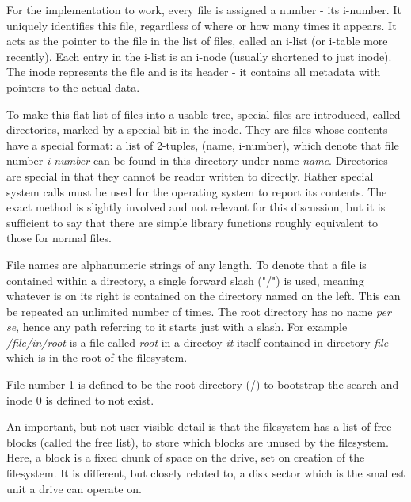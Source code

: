         For the implementation to work, every file is assigned a number - its
        i-number. It uniquely identifies this file, regardless of where or how
        many times it appears. It acts as the pointer to the file in the list
        of files, called an i-list (or i-table more recently). Each entry in
        the i-list is an i-node (usually shortened to just
        inode). The inode represents the file and is its header - it contains
        all metadata with pointers to the actual data.

        To make this flat list of files into a usable tree, special files are
        introduced, called directories, marked by a special bit in the inode.
        They are files whose contents have a special format: a list of
        2-tuples, (name, i-number), which denote that file number
        \textit{i-number} can be found in this directory under name
        \textit{name}. Directories are special in that they cannot be reador
        written to directly. Rather special system calls must be used for the
        operating system to report its contents. The exact method is slightly
        involved and not relevant for this discussion, but it is sufficient to
        say that there are simple library functions roughly equivalent to those
        for normal files.

        File names are alphanumeric strings of any length. To denote that a
        file is contained within a directory, a single forward slash ("/") is
        used, meaning whatever is on its right is contained on the directory
        named on the left. This can be repeated an unlimited number of times.
        The root directory has no name \textit{per se}, hence any path referring
        to it starts just with a slash. For example \textit{/file/in/root} is a file
        called \textit{root} in a directoy \textit{it} itself contained in
        directory \textit{file} which is in the root of the filesystem.

        File number 1 is defined to be the root directory (/) to bootstrap
        the search and inode 0 is defined to not exist.

        An important, but not user visible detail is that the filesystem has a
        list of free blocks (called the free list), to store which blocks are
        unused by the filesystem. Here, a block is a fixed chunk of space on
        the drive, set on creation of the filesystem. It is different, but
        closely related to, a disk sector which is the smallest unit a drive
        can operate on.

